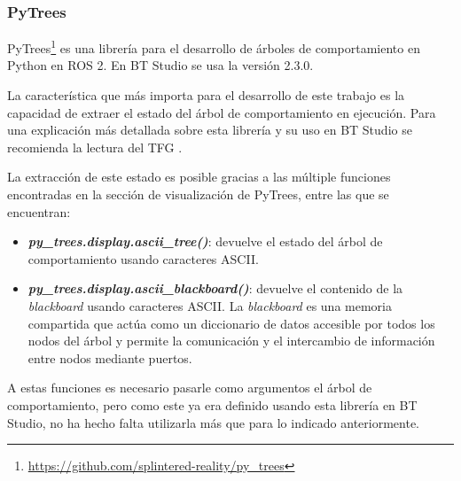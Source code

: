 \subsubsection{PyTrees} \label{sec:blackboard}

PyTrees\footnote{\url{https://github.com/splintered-reality/py_trees}} es una librería para el desarrollo de árboles de comportamiento en Python en ROS 2. En BT Studio se usa la versión 2.3.0.

La característica que más importa para el desarrollo de este trabajo es la capacidad de extraer el estado del árbol de comportamiento en ejecución. Para una explicación más detallada sobre esta librería y su uso en BT Studio se recomienda la lectura del TFG \cite{TFG_BT_Studio}.

La extracción de este estado es posible gracias a las múltiple funciones encontradas en la sección de visualización de PyTrees, entre las que se encuentran:

\begin{itemize}
    \item \textbf{\textit{py\_trees.display.ascii\_tree()}}: devuelve el estado del árbol de comportamiento usando caracteres ASCII.
    \item \textbf{\textit{py\_trees.display.ascii\_blackboard()}}: devuelve el contenido de la \textit{blackboard} usando caracteres ASCII. La \textit{blackboard} es una memoria compartida que actúa como un diccionario de datos accesible por todos los nodos del árbol y permite la comunicación y el intercambio de información entre nodos mediante puertos.
\end{itemize}

A estas funciones es necesario pasarle como argumentos el árbol de comportamiento, pero como este ya era definido usando esta librería en BT Studio, no ha hecho falta utilizarla más que para lo indicado anteriormente.




